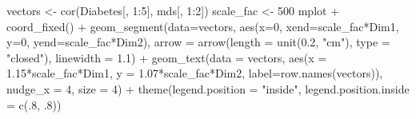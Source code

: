 \documentclass[
  letterpaper,
  10pt,
  krantz2]{krantz}
\makeatletter
\newenvironment{Shaded}{\begin{snugshade}}{\end{snugshade}}
\newcommand{\AttributeTok}[1]{\textcolor[rgb]{0.40,0.45,0.13}{#1}}
\newcommand{\DecValTok}[1]{\textcolor[rgb]{0.68,0.00,0.00}{#1}}
\newcommand{\FloatTok}[1]{\textcolor[rgb]{0.68,0.00,0.00}{#1}}
\newcommand{\FunctionTok}[1]{\textcolor[rgb]{0.28,0.35,0.67}{#1}}
\newcommand{\NormalTok}[1]{\textcolor[rgb]{0.00,0.23,0.31}{#1}}
\newcommand{\OtherTok}[1]{\textcolor[rgb]{0.00,0.23,0.31}{#1}}
\newcommand{\SpecialCharTok}[1]{\textcolor[rgb]{0.37,0.37,0.37}{#1}}
\newcommand{\StringTok}[1]{\textcolor[rgb]{0.13,0.47,0.30}{#1}}
\newenvironment{kframe}{%
  \medskip{}
  \setlength{\fboxsep}{.8em}
  \def\at@end@of@kframe{}%
  \ifinner\ifhmode%
  \def\at@end@of@kframe{\end{minipage}}%
  \begin{minipage}{\columnwidth}%
  \fi\fi%
  \def\FrameCommand##1{\hskip\@totalleftmargin \hskip-\fboxsep
  \colorbox{shadecolor}{##1}\hskip-\fboxsep
      \hskip-\linewidth \hskip-\@totalleftmargin \hskip\columnwidth}%
  \MakeFramed {\advance\hsize-\width
    \@totalleftmargin\z@ \linewidth\hsize
    \@setminipage}}%
{\par\unskip\endMakeFramed%
  \at@end@of@kframe}
\renewenvironment{Shaded}{\begin{kframe}}{\end{kframe}}
\makeatother
\begin{document}
\begin{Shaded}
\begin{Highlighting}[]
\NormalTok{vectors }\OtherTok{\textless{}{-}} \FunctionTok{cor}\NormalTok{(Diabetes[, }\DecValTok{1}\SpecialCharTok{:}\DecValTok{5}\NormalTok{], mds[, }\DecValTok{1}\SpecialCharTok{:}\DecValTok{2}\NormalTok{])}
\NormalTok{scale\_fac }\OtherTok{\textless{}{-}} \DecValTok{500}
\NormalTok{mplot }\SpecialCharTok{+} 
  \FunctionTok{coord\_fixed}\NormalTok{() }\SpecialCharTok{+}
  \FunctionTok{geom\_segment}\NormalTok{(}\AttributeTok{data=}\NormalTok{vectors,}
               \FunctionTok{aes}\NormalTok{(}\AttributeTok{x=}\DecValTok{0}\NormalTok{, }\AttributeTok{xend=}\NormalTok{scale\_fac}\SpecialCharTok{*}\NormalTok{Dim1, }\AttributeTok{y=}\DecValTok{0}\NormalTok{, }\AttributeTok{yend=}\NormalTok{scale\_fac}\SpecialCharTok{*}\NormalTok{Dim2),}
               \AttributeTok{arrow =} \FunctionTok{arrow}\NormalTok{(}\AttributeTok{length =} \FunctionTok{unit}\NormalTok{(}\FloatTok{0.2}\NormalTok{, }\StringTok{"cm"}\NormalTok{), }\AttributeTok{type =} \StringTok{"closed"}\NormalTok{),}
               \AttributeTok{linewidth =} \FloatTok{1.1}\NormalTok{) }\SpecialCharTok{+}
  \FunctionTok{geom\_text}\NormalTok{(}\AttributeTok{data =}\NormalTok{ vectors,}
            \FunctionTok{aes}\NormalTok{(}\AttributeTok{x =} \FloatTok{1.15}\SpecialCharTok{*}\NormalTok{scale\_fac}\SpecialCharTok{*}\NormalTok{Dim1, }\AttributeTok{y =} \FloatTok{1.07}\SpecialCharTok{*}\NormalTok{scale\_fac}\SpecialCharTok{*}\NormalTok{Dim2, }
                \AttributeTok{label=}\FunctionTok{row.names}\NormalTok{(vectors)),}
            \AttributeTok{nudge\_x =} \DecValTok{4}\NormalTok{,}
            \AttributeTok{size =} \DecValTok{4}\NormalTok{) }\SpecialCharTok{+}
  \FunctionTok{theme}\NormalTok{(}\AttributeTok{legend.position =} \StringTok{"inside"}\NormalTok{,}
        \AttributeTok{legend.position.inside =} \FunctionTok{c}\NormalTok{(.}\DecValTok{8}\NormalTok{, .}\DecValTok{8}\NormalTok{))}
\end{Highlighting}
\end{Shaded}
\end{document}
